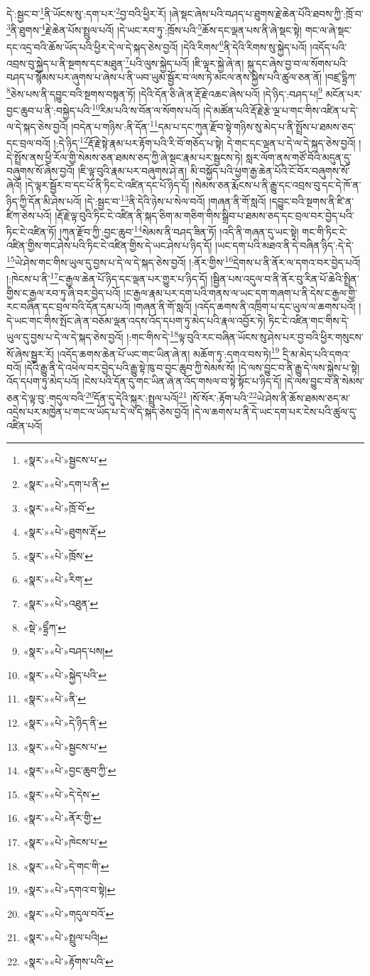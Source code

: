 དེ་:སྦྱང་བ་\footnote{«སྣར་»«པེ་»སྦྱངས་པ་}ནི་ཡོངས་སུ་:དག་པར་\footnote{«སྣར་»«པེ་»དག་པ་ནི་}བྱ་བའི་ཕྱིར་རོ། །ཞེ་སྡང་ཞེས་པའི་བཤད་པ་ཐུགས་རྗེ་ཆེན་པོའི་ཐབས་ཀྱི་:ཁྲོ་བ་\footnote{«སྣར་»«པེ་»ཁྲོ་བོ་}ནི་ཐུགས་\footnote{«སྣར་»«པེ་»ཐུགས་རྡོ་}རྗེ་ཆེན་པོས་སྤྲུལ་པའོ། །དེ་ཡང་རབ་ཏུ་:ཁྲོས་པའི་\footnote{«སྣར་»«པེ་»ཁྲོས་}ཆོས་དང་ལྡན་པས་ནི་ཞེ་སྡང་སྟེ། གང་ལ་ཞེ་སྡང་དང་འདྲ་བའི་ཆོས་ཡོད་པའི་ཕྱིར་དེ་ལ་དེ་སྐད་ཅེས་བྱའོ། །དེའི་རིགས་\footnote{«སྣར་»«པེ་»རིག་}ནི་དེའི་རིགས་སུ་སྐྱེད་པའོ། །འདོད་པའི་འབྲས་བུ་སྐྱེད་པ་ནི་སྔགས་དང་མཐུན་\footnote{«སྣར་»«པེ་»འཐུན་}པའི་ལུས་སྐྱེད་པའོ། །ཇི་ལྟར་སྐྱེ་ཞེ་ན། སྐུ་དང་ཞེས་བྱ་བ་ལ་སོགས་པའི་བཤད་པ་སྙོམས་པར་ཞུགས་པ་ཞེས་པ་ནི་ཡབ་ཡུམ་སྦྱོར་བ་ལས་ཏེ་མངལ་ནས་སྐྱེས་པའི་ཚུལ་ཅན་ནོ། །བཛྲ་དྷྲིཀ་\footnote{«སྡེ་»དྷྲྀཀ་}ཅེས་པས་ནི་དབྱུང་བའི་སྔགས་བསྟན་ཏོ། །དེའི་དོན་ཅི་ཞེ་ན་རྡོ་རྗེ་འཆང་ཞེས་པའོ། །དེ་ཉིད་:བཤད་པ།\footnote{«སྣར་»«པེ་»བཤད་པས།} མངོན་པར་བྱང་ཆུབ་པ་ནི་:བསྐྱེད་པའི་\footnote{«སྣར་»«པེ་»སྐྱེད་པའི་}རིམ་པའི་ས་བོན་ལ་སོགས་པའོ། །དེ་མཚོན་པའི་རྡོ་རྗེ་རྩེ་ལྔ་པ་གང་གིས་འཛིན་པ་དེ་ལ་དེ་སྐད་ཅེས་བྱའོ། །བདེན་པ་གཉིས་:ནི་དོན་\footnote{«སྣར་»«པེ་»ནི་}དམ་པ་དང་ཀུན་རྫོབ་སྟེ་གཉིས་སུ་མེད་པ་ནི་སྤྲོས་པ་ཐམས་ཅད་དང་བྲལ་བའོ། །:དེ་ཉིད་\footnote{«སྣར་»«པེ་»དེ་ཉིད་ནི་}རྡོ་རྗེ་སྟེ་རྣམ་པར་རྟོག་པའི་རི་བོ་གཅོད་པ་སྟེ། དེ་གང་དང་ལྡན་པ་དེ་ལ་དེ་སྐད་ཅེས་བྱའོ། །དེ་སྤྲོས་ནས་ཕྱི་རོལ་གྱི་སེམས་ཅན་ཐམས་ཅད་ཀྱི་ཞེ་སྡང་རྣམ་པར་སྦྱངས་ཏེ། སླར་ལོག་ནས་གཙོ་བོའི་མདུན་དུ་བཞུགས་སོ་ཞེས་བྱའོ། །ཇི་ལྟ་བུའི་རྣམ་པར་བཞུགས་ཤེ་ན། མི་བསྐྱོད་པའི་ཕྱག་རྒྱ་ཆེན་པོའི་ངོ་བོར་བཞུགས་སོ་ཞེའོ། །དེ་ལྟར་སྦྱོར་བ་དང་པོ་ནི་ཏིང་ངེ་འཛིན་དང་པོ་ཉིད་དོ། །སེམས་ཅན་རྨོངས་པ་ནི་རྒྱུ་དང་འབྲས་བུ་དང་དེ་ཁོ་ན་ཉིད་ཀྱི་དོན་མི་ཤེས་པའོ། །དེ་:སྦྱང་བ་\footnote{«སྣར་»«པེ་»སྦྱངས་པ་}ནི་དེའི་ཉེས་པ་སེལ་བའོ། །གཞན་ནི་གོ་སླའོ། །དབྱུང་བའི་སྔགས་ནི་ཛི་ན་ཛིཀ་ཅེས་པའོ། །རྡོ་རྗེ་ལྟ་བུའི་ཏིང་ངེ་འཛིན་ནི་སྐད་ཅིག་མ་གཅིག་གིས་སྒྲིབ་པ་ཐམས་ཅད་དང་བྲལ་བར་བྱེད་པའི་ཏིང་ངེ་འཛིན་ཏོ། །ཀུན་རྫོབ་ཀྱི་:བྱང་ཆུབ་\footnote{«སྣར་»«པེ་»བྱང་ཆུབ་ཀྱི་}སེམས་ནི་བཤད་ཟིན་ཏོ། །འདི་ནི་གཞན་དུ་ཡང་སྟེ། གང་གི་ཏིང་ངེ་འཛིན་གྱིས་གང་ཤེས་པའི་ཏིང་ངེ་འཛིན་གྱིས་དེ་ཡང་ཤེས་པ་ཉིད་དོ། །ཡང་དག་པའི་མཐའ་ནི་དེ་བཞིན་ཉིད་:དེ་དེ་\footnote{«སྣར་»«པེ་»དེ་དེས་}ཡེ་ཤེས་གང་གིས་ཡུལ་དུ་བྱས་པ་དེ་ལ་དེ་སྐད་ཅེས་བྱའོ། །:ནོར་གྱིས་\footnote{«སྣར་»«པེ་»ནོར་གྱི་}དྲེགས་པ་ནི་ནོར་ལ་དགའ་བར་བྱེད་པའོ། །:ཁེངས་པ་ནི་\footnote{«སྣར་»«པེ་»ཁེངས་པ་}ང་རྒྱལ་ཆེན་པོ་ཉིད་དང་ལྡན་པར་གྱུར་པ་ཉིད་དོ། །སྦྱིན་པས་འདུལ་བ་ནི་ནོར་བུ་རིན་པོ་ཆེའི་སྤྲིན་གྱིས་ང་རྒྱལ་རབ་ཏུ་ཞི་བར་བྱེད་པའོ། །ང་རྒྱལ་རྣམ་པར་དག་པའི་གནས་ལ་ཡང་དག་གཞག་པ་ནི་དེས་ང་རྒྱལ་གྱི་རང་བཞིན་དང་བྲལ་བའི་དོན་དམ་པའོ། །གཞན་ནི་གོ་སླའོ། །འདོད་ཆགས་ནི་འཁྲིག་པ་དང་ཡུལ་ལ་ཆགས་པའོ། །དེ་ཡང་གང་གིས་སྤོང་ཞེ་ན་བཅོམ་ལྡན་འདས་འོད་དཔག་ཏུ་མེད་པའི་རྣལ་འབྱོར་ཏེ། ཏིང་ངེ་འཛིན་གང་གིས་དེ་ཡུལ་དུ་བྱས་པ་དེ་ལ་དེ་སྐད་ཅེས་བྱའོ། །:གང་གིས་དེ་\footnote{«སྣར་»«པེ་»དེ་གང་གི་}ལྟ་བུའི་རང་བཞིན་ཡོངས་སུ་ཤེས་པར་བྱ་བའི་ཕྱིར་གསུངས་སོ་ཞེས་སྦྱར་རོ། །འདོད་ཆགས་ཆེན་པོ་ཡང་གང་ཡིན་ཞེ་ན། མཆོག་ཏུ་:དགའ་བས་ཏེ།\footnote{«སྣར་»«པེ་»དགའ་བ་སྟེ།} དྲི་མ་མེད་པའི་དགའ་བའོ། །དེའི་རྒྱུ་ནི་དེ་འཕེལ་བར་བྱེད་པའི་རྒྱུ་སྟེ་ཁུ་བ་བྱང་ཆུབ་ཀྱི་སེམས་སོ། །དེ་ལས་བྱུང་བ་ནི་རྒྱུ་དེ་ལས་སྐྱེས་པ་སྟེ། འོད་དཔག་ཏུ་མེད་པའོ། །ངེས་པའི་དོན་དུ་གང་ཡིན་ཞེ་ན་འོད་གསལ་བ་སྟེ་སྟོང་པ་ཉིད་དོ། །དེ་ལས་བྱུང་བ་ནི་སེམས་ཅན་དེ་ལྟ་བུ་:གདུལ་བའི་\footnote{«སྣར་»«པེ་»གདུལ་བའོ་}དོན་དུ་དེའི་སྐུར་:སྤྲུལ་པའོ།\footnote{«སྣར་»«པེ་»སྤྲུལ་པའི།} །སོ་སོར་:རྟོག་པའི་\footnote{«སྣར་»«པེ་»རྟོགས་པའི་}ཡེ་ཤེས་ནི་ཆོས་ཐམས་ཅད་མ་འདྲེས་པར་མཁྱེན་པ་གང་ལ་ཡོད་པ་དེ་ལ་དེ་སྐད་ཅེས་བྱའོ། །དེ་ལ་ཆགས་པ་ནི་དེ་ཡང་དག་པར་ངེས་པའི་ཚུལ་དུ་འཛིན་པའོ། 